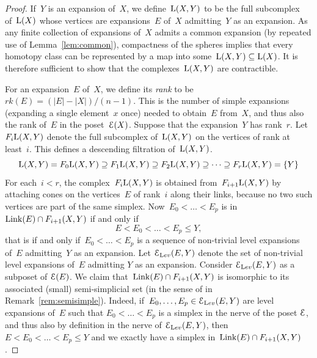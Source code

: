 \begin{proof}
If~$Y$ is an expansion of~$X$, we define~$\mathrm{L}(X,Y)$ to be the full subcomplex of~$\mathrm{L}(X)$ whose vertices are expansions~$E$ of~$X$ admitting~$Y$ as an expansion. As any finite collection of expansions of~$X$ admits a common expansion (by repeated use of Lemma~\ref{lem:common}), compactness of the spheres implies that every homotopy class can be represented by a map into some~\hbox{$\mathrm{L}(X,Y)\subseteq\mathrm{L}(X)$}. It is therefore sufficient to show that the complexes~$\mathrm{L}(X,Y)$ are contractible.

For an expansion~$E$ of~$X$, we define its {\em rank} to be~$rk(E)=(|E|-|X|)/(n-1)$. This is the number of simple expansions (expanding a single element~$x$ once) needed to obtain~$E$ from~$X$, and thus also the rank of~$E$ in the poset~$\mathcal{E}(X)$. Suppose that the expansion~$Y$ has rank~$r$. Let~$F_i\mathrm{L}(X,Y)$ denote the full subcomplex of~$\mathrm{L}(X,Y)$ on the vertices of rank at least~$i$. This defines a descending filtration of~$\mathrm{L}(X,Y)$. 
\[
\mathrm{L}(X,Y)=F_0\mathrm{L}(X,Y)\supseteq F_1\mathrm{L}(X,Y)\supseteq F_2\mathrm{L}(X,Y)\supseteq\dots\supseteq F_r\mathrm{L}(X,Y)=\{Y\}
\]
For each~$i<r$,  the complex~$F_i\mathrm{L}(X,Y)$ is obtained  from~$F_{i+1}\mathrm{L}(X,Y)$ by attaching cones on the vertices~$E$ of rank~$i$ along their links, because no two such vertices are part of the same simplex. Now~$E_0<\dots<E_p$ is in~$\operatorname{Link}(E)\cap F_{i+1}(X,Y)$ if and only if 
$$E<E_0<\dots<E_p\le Y,$$
that is if and only if~$E_0<\dots<E_p$ is a sequence of non-trivial level expansions of~$E$ admitting~$Y$ as an expansion. 
Let $\mathcal{E}_{\textrm Lev}(E,Y)$ denote the set of non-trivial level expansions of~$E$ admitting $Y$ as an expansion. Consider $\mathcal{E}_{\textrm Lev}(E,Y)$ as a subposet of $\mathcal{E}(E)$. We claim  that~\hbox{$\operatorname{Link}(E)\cap F_{i+1}(X,Y)$} is isomorphic to its associated (small) semi-simplicial set (in the sense of in Remark~\ref{rem:semisimple}). 
Indeed, if~$E_0,\dots,E_p\in \mathcal{E}_{\textrm Lev}(E,Y)$ are level expansions of~$E$ such that $E_0<\dots<E_p$ is a simplex in the nerve of the poset $\mathcal{E}$, and thus also by definition in the nerve of  $\mathcal{E}_{\textrm Lev}(E,Y)$, then $E<E_0<\dots<E_p\le Y$ and we exactly have a simplex in~\hbox{$\operatorname{Link}(E)\cap F_{i+1}(X,Y)$}. 



\end{proof}
